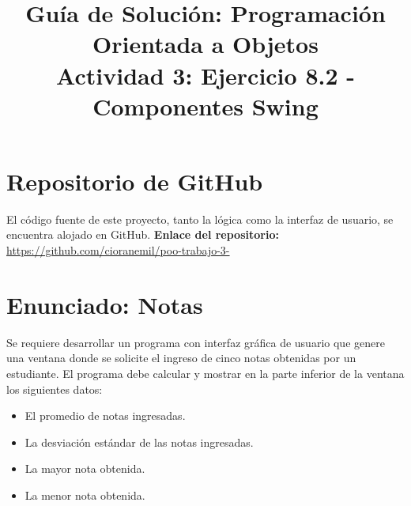 \documentclass[12pt,a4paper]{article}
\title{\textbf{Guía de Solución: Programación Orientada a Objetos} \\ \large Actividad 3: Ejercicio 8.2 - Componentes Swing}
\author{}
\date{}
\begin{document}
\maketitle

\section{Repositorio de GitHub}
El código fuente de este proyecto, tanto la lógica como la interfaz de usuario, se encuentra alojado en GitHub. 
\newline
\textbf{Enlace del repositorio:} \url{https://github.com/cioranemil/poo-trabajo-3-}

\section{Enunciado: Notas}
Se requiere desarrollar un programa con interfaz gráfica de usuario que genere una ventana donde se solicite el ingreso de cinco notas obtenidas por un estudiante.
El programa debe calcular y mostrar en la parte inferior de la ventana los siguientes datos:
\begin{itemize}
    \item El promedio de notas ingresadas.
    \item La desviación estándar de las notas ingresadas.
    \item La mayor nota obtenida.
    \item La menor nota obtenida.
\end{itemize}
\end{document}
